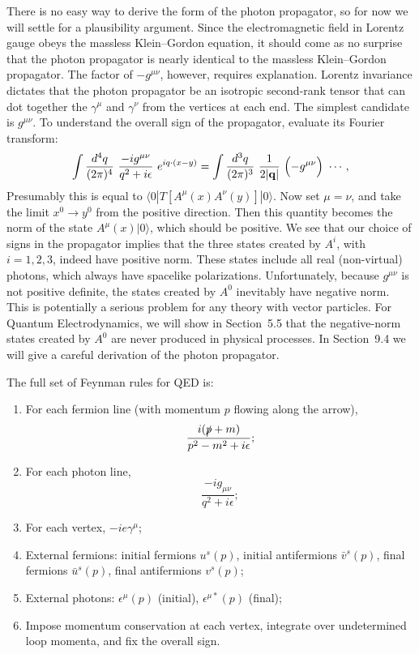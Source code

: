 There is no easy way to derive the form of the photon propagator, so for now
we will settle for a plausibility argument.  Since the electromagnetic field
in Lorentz gauge obeys the massless Klein--Gordon equation, it should come as
no surprise that the photon propagator is nearly identical to the massless
Klein--Gordon propagator.  The factor of $-g^{\mu\nu}$, however, requires
explanation.  Lorentz invariance dictates that the photon propagator be an
isotropic second-rank tensor that can dot together the $\gamma^\mu$ and
$\gamma^\nu$ from the vertices at each end.  The simplest candidate is
$g^{\mu\nu}$.  To understand the overall sign of the propagator, evaluate its
Fourier transform:
\begin{equation}
  \int \frac{d^4q}{(2\pi)^4}\ \frac{-ig^{\mu\nu}}{q^2+i\epsilon}\
    e^{iq\cdot(x-y)}
  = \int \frac{d^3q}{(2\pi)^3}\ \frac{1}{2|\mathbf{q}|}\
    \Bigl( -g^{\mu\nu} \Bigr)\ \cdots ,
  \label{eq:4.132b}
\end{equation}
Presumably this is equal to $\langle 0|T[A^\mu(x)A^\nu(y)]|0\rangle$.  Now
set $\mu = \nu$, and take the limit $x^0\to y^0$ from the positive direction.
Then this quantity becomes the norm of the state $A^\mu(x)|0\rangle$, which
should be positive.  We see that our choice of signs in the propagator
implies that the three states created by $A^i$, with $i = 1, 2, 3$, indeed
have positive norm.  These states include all real (non-virtual) photons,
which always have spacelike polarizations.  Unfortunately, because $g^{\mu\nu}$
is not positive definite, the states created by $A^0$ inevitably have negative
norm.  This is potentially a serious problem for any theory with vector
particles.  For Quantum Electrodynamics, we will show in Section~5.5 that the
negative-norm states created by $A^0$ are never produced in physical
processes.  In Section~9.4 we will give a careful derivation of the photon
propagator.

The full set of Feynman rules for QED is:
\begin{enumerate}
  \item For each fermion line (with momentum $p$ flowing along the arrow),
    \begin{equation}
      \frac{i(\slashed{p}+m)}{p^2-m^2+i\epsilon} ;
    \end{equation}
  \item For each photon line,
    \begin{equation}
      \frac{-ig_{\mu\nu}}{q^2+i\epsilon} ;
    \end{equation}
  \item For each vertex, $-ie\gamma^\mu$;
  \item External fermions: initial fermions $u^s(p)$, initial antifermions
    $\bar{v}^s(p)$, final fermions $\bar{u}^s(p)$, final antifermions
    $v^s(p)$;
  \item External photons: $\epsilon^\mu(p)$ (initial), $\epsilon^{\mu*}(p)$
    (final);
  \item Impose momentum conservation at each vertex, integrate over
    undetermined loop momenta, and fix the overall sign.
\end{enumerate}


